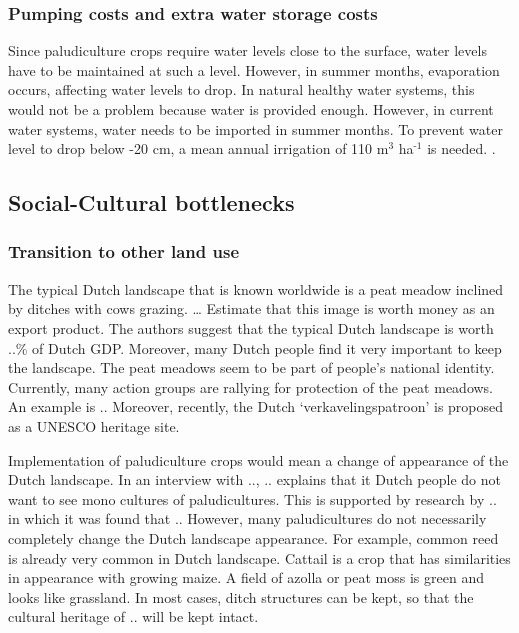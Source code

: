 \documentclass[12pt,a4paper,titlepage]{article}
\newcommand{\sur}[1]{\ensuremath{^{\textrm{#1}}}}
\begin{document}
\subsubsection{Pumping costs and extra water storage costs}

Since paludiculture crops require water levels close to the surface, water levels have to be maintained at such a level. However, in summer months, evaporation occurs, affecting water levels to drop. In natural healthy water systems, this would not be a problem because water is provided enough. However, in current water systems, water needs to be imported in summer months. To prevent water level to drop below -20 cm, a mean annual irrigation of 110 m\sur{3} ha\sur{-1} is needed.  \citep{wichtmann2016paludiculture}. 

\subsection{Social-Cultural bottlenecks}

\subsubsection{Transition to other land use}

The typical Dutch landscape that is known worldwide is a peat meadow inclined by ditches with cows grazing. … Estimate that this image is worth money as an export product. The authors suggest that the typical Dutch landscape is worth ..\% of Dutch GDP. Moreover, many Dutch people find it very important to keep the landscape. The peat meadows seem to be part of people’s national identity. Currently, many action groups are rallying for protection of the peat meadows. An example is .. Moreover, recently, the Dutch ‘verkavelingspatroon’ is proposed as a UNESCO heritage site. 

Implementation of paludiculture crops would mean a change of appearance of the Dutch landscape. In an interview with .., .. explains that it Dutch people do not want to see mono cultures of paludicultures. This is supported by research by .. in which it was found that .. However, many paludicultures do not necessarily completely change the Dutch landscape appearance. For example, common reed is already very common in Dutch landscape. Cattail is a crop that has similarities in appearance with growing maize. A field of azolla or peat moss is green and looks like grassland. In most cases, ditch structures can be kept, so that the cultural heritage of .. will be kept intact. 
\end{document}
